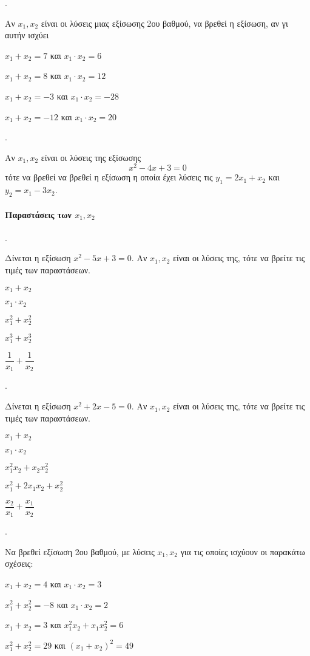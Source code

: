 \documentclass[11pt,a4paper,twocolumn]{article}
\newcounter{askhsh}
\newcommand{\askhsh}{{\large\theaskhsh.}\ \addtocounter{askhsh}{1}}
\begin{document}
\askhsh 
Αν $ x_1, x_2 $ είναι οι λύσεις μιας εξίσωσης 2{ου} βαθμού, να βρεθεί η εξίσωση, αν γι αυτήν ισχύει
\begin{alist}
\item $ x_1+x_2=7 $ και $ x_1\cdot x_2=6 $
\item $ x_1+x_2=8 $ και $ x_1\cdot x_2=12 $
\item $ x_1+x_2=-3 $ και $ x_1\cdot x_2=-28 $
\item $ x_1+x_2=-12 $ και $ x_1\cdot x_2=20 $
\end{alist}
\askhsh
Αν $ x_1,x_2 $ είναι οι λύσεις της εξίσωσης \[ x^2-4x+3=0 \] τότε να βρεθεί να βρεθεί η εξίσωση η οποία έχει λύσεις τις $ y_1=2x_1+x_2 $ και $ y_2=x_1-3x_2 $.
\paragraph{Παραστάσεις των $x_1,x_2$}
\askhsh Δίνεται η εξίσωση $x^2-5x+3=0$. Αν $x_1,x_2$ είναι οι λύσεις της, τότε να βρείτε τις τιμές των παραστάσεων.
\begin{multicols}{2}
\begin{alist}
\item $x_1+x_2$
\item $x_1\cdot x_2$
\item $x_1^2+x_2^2$
\item $x_1^3+x_2^3$
\item $\dfrac{1}{x_1}+\dfrac{1}{x_2}$
\end{alist}
\end{multicols}
\askhsh Δίνεται η εξίσωση $x^2+2x-5=0$. Αν $x_1,x_2$ είναι οι λύσεις της, τότε να βρείτε τις τιμές των παραστάσεων.
\begin{multicols}{2}
\begin{alist}
\item $x_1+x_2$
\item $x_1\cdot x_2$
\item $x_1^2x_2+x_2x_2^2$
\item $ x_1^2+2x_1x_2+x_2^2 $
\item $\dfrac{x_2}{x_1}+\dfrac{x_1}{x_2}$
\end{alist}
\end{multicols}

\askhsh
Να βρεθεί εξίσωση 2ου βαθμού, με λύσεις $ x_1, x_2 $ για τις οποίες ισχύουν οι παρακάτω σχέσεις:
\begin{alist}
\item $ x_1+x_2=4 $ και $ x_1\cdot x_2=3 $
\item $ x_1^2+x_2^2=-8 $ και $ x_1\cdot x_2=2 $
\item $ x_1+x_2=3 $ και $ x_1^2x_2+x_1x_2^2=6 $
\item $ x_1^2+x_2^2=29 $ και $ (x_1+x_2)^2=49 $
\end{alist}
\end{document}
